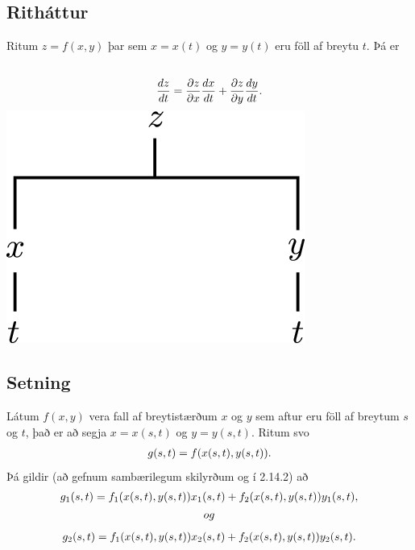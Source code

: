 \documentclass[a4paper,10pt,icelandic]{sphinxmanual}
\begin{document}
\subsection{Ritháttur}
\label{Kafli2:id18}
Ritum \(z=f(x,y)\) þar sem \(x=x(t)\) og \(y=y(t)\) eru föll
af breytu \(t\). Þá er
\begin{gather}
\begin{split}\displaystyle\end{split}\notag\\\begin{split}\frac{dz}{dt}=\frac{\partial z}{\partial x}\frac{dx}{dt}
+\frac{\partial z}{\partial y}\frac{dy}{dt}.\end{split}\notag
\end{gather}
{\hfill\includegraphics[width=0.270\linewidth]{chain1.png}\hfill}


\subsection{Setning}
\label{Kafli2:id19}
Látum \(f(x,y)\) vera fall af breytistærðum \(x\) og \(y\)
sem aftur eru föll af breytum \(s\) og \(t\), það er að segja
\(x=x(s,t)\) og \(y=y(s,t)\). Ritum svo
\begin{gather}
\begin{split}\displaystyle g(s,t)=f(x(s,t),y(s,t)).\end{split}\notag
\end{gather}
Þá gildir (að gefnum sambærilegum skilyrðum og í 2.14.2) að
\begin{gather}
\begin{split}\displaystyle g_1(s,t)=f_1(x(s,t),y(s,t))x_1(s,t)+f_2(x(s,t),y(s,t))y_1(s,t),\end{split}\notag\\\begin{split}og\end{split}\notag
\end{gather}\begin{gather}
\begin{split}\displaystyle g_2(s,t)=f_1(x(s,t),y(s,t))x_2(s,t)+f_2(x(s,t),y(s,t))y_2(s,t).\end{split}\notag
\end{gather}
\end{document}
